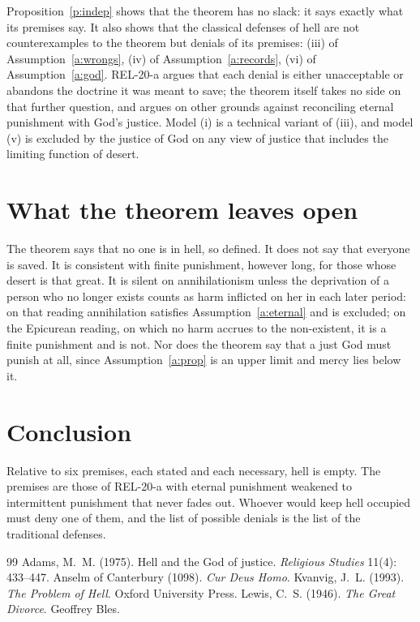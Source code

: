 \documentclass{situationist-preprint}
\begin{document}
Proposition~\ref{p:indep} shows that the theorem has no slack: it says exactly what its premises say. It also shows that the classical defenses of hell are not counterexamples to the theorem but denials of its premises: (iii) of Assumption~\ref{a:wrongs}, (iv) of Assumption~\ref{a:records}, (vi) of Assumption~\ref{a:god}. REL-20-a argues that each denial is either unacceptable or abandons the doctrine it was meant to save; the theorem itself takes no side on that further question, and \citet{Adams1975} argues on other grounds against reconciling eternal punishment with God's justice. Model (i) is a technical variant of (iii), and model (v) is excluded by the justice of God on any view of justice that includes the limiting function of desert.

\section{What the theorem leaves open}

The theorem says that no one is in hell, so defined. It does not say that everyone is saved. It is consistent with finite punishment, however long, for those whose desert is that great. It is silent on annihilationism unless the deprivation of a person who no longer exists counts as harm inflicted on her in each later period: on that reading annihilation satisfies Assumption~\ref{a:eternal} and is excluded; on the Epicurean reading, on which no harm accrues to the non-existent, it is a finite punishment and is not. Nor does the theorem say that a just God must punish at all, since Assumption~\ref{a:prop} is an upper limit and mercy lies below it.

\section{Conclusion}

Relative to six premises, each stated and each necessary, hell is empty. The premises are those of REL-20-a with eternal punishment weakened to intermittent punishment that never fades out. Whoever would keep hell occupied must deny one of them, and the list of possible denials is the list of the traditional defenses.

\begin{thebibliography}{99}\small
{} Adams, M.~M. (1975). Hell and the God of justice. \emph{Religious Studies} 11(4): 433--447.
 Anselm of Canterbury (1098). \emph{Cur Deus Homo}.
 Kvanvig, J.~L. (1993). \emph{The Problem of Hell}. Oxford University Press.
 Lewis, C.~S. (1946). \emph{The Great Divorce}. Geoffrey Bles.
\end{thebibliography}
\end{document}
